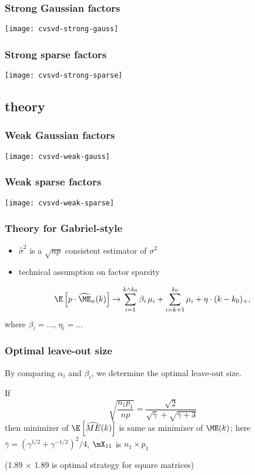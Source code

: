\documentclass[14pt]{beamer}
\begin{document}
\begin{frame}
  \frametitle{Strong Gaussian factors}
  \begin{center}
  \texttt{[image: cvsvd-strong-gauss]}
  \end{center}
\end{frame}

\begin{frame}
  \frametitle{Strong sparse factors}
  \begin{center}
  \texttt{[image: cvsvd-strong-sparse]}
  \end{center}
\end{frame}
\subsection{theory}

\begin{frame}
  \frametitle{Weak Gaussian factors}
  \begin{center}
  \texttt{[image: cvsvd-weak-gauss]}
  \end{center}
\end{frame}


\begin{frame}
  \frametitle{Weak sparse factors}
  \begin{center}
  \texttt{[image: cvsvd-weak-sparse]}
  \end{center}
\end{frame}

\begin{frame}
  \frametitle{Theory for Gabriel-style}
  \begin{itemize}
  \item $\hat \sigma^2$ is a $\sqrt{np}$ consistent estimator of $\sigma^2$
  \item technical assumption on factor sparsity
  \end{itemize}
  \begin{theorem}
  \[
\E \left[ p \cdot \widehat{\ME}_n(k) \right]
			\to
				\sum_{i=1}^{k \wedge k_0}
					\beta_i \, \mu_i
				+
				\sum_{i=k+1}^{k_0}
					\mu_i
				+
				\eta
				\cdot
				(k - k_0)_+,
  \]
  where $\beta_i = \ldots$, $\eta_i = \ldots$
  \end{theorem}
\end{frame}

\begin{frame}
  \frametitle{Optimal leave-out size}
  By comparing $\alpha_i$ and $\beta_i$, we determine the optimal leave-out size.
  \begin{theorem}
    If
    \[
       \sqrt{\frac{n_1 p_1}{n p}}
       =
       \frac{\sqrt{2}}{\sqrt{\bar \gamma} + \sqrt{\bar \gamma + 3}}
    \]
    then minimizer of $\E\left[\widehat{ME}(k)\right]$ is same as minimizer of $\ME(k)$;
    here
    \(
      \bar \gamma = (\gamma^{1/2} + \gamma^{-1/2})^2/4
    \),
    $\mX_{11}$ is $n_1 \times p_1$
  \end{theorem}
  (1.89 $\times$ 1.89 is optimal strategy for square matrices)
\end{frame}
\end{document}
